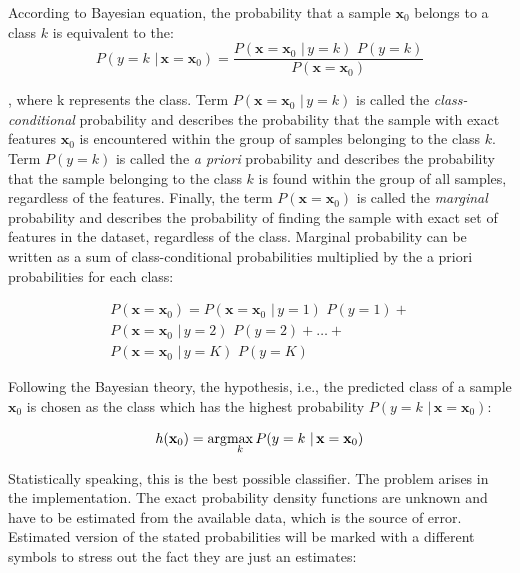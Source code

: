 According to Bayesian equation, the probability that a sample $\mathbf{x}_0$ belongs to a class $k$ is equivalent to the: 
\begin{equation} 
P(y=k \,\, | \, \mathbf{x}=\mathbf{x}_0) = \frac{P(\mathbf{x}=\mathbf{x}_0  \,\, | \, y=k) \,\,P(y=k)} {P(\mathbf{x}=\mathbf{x}_0)}
\end{equation}

\noindent
, where k represents the class. Term $P(\mathbf{x}=\mathbf{x}_0  \,\, | \, y=k)$ is called the \emph{class-conditional} probability and describes the probability that the sample with exact features $\mathbf{x}_0$ is encountered within the group of samples belonging to the class $k$. Term $P(y=k)$ is called the \emph{a priori} probability and describes the probability that the sample belonging to the class $k$ is found within the group of all samples, regardless of the features. Finally, the term $P(\mathbf{x}=\mathbf{x}_0)$ is called the \emph{marginal} probability and describes the probability of finding the sample with exact set of features in the dataset, regardless of the class. Marginal probability can be written as a sum of class-conditional probabilities multiplied by the a priori probabilities for each class:

\begin{equation}
\begin{split}
P(\mathbf{x}=\mathbf{x}_0) = P(\mathbf{x}=\mathbf{x}_0  \,\, | \, y=1) \,\,P(y=1) + \\
P(\mathbf{x}=\mathbf{x}_0  \,\, | \, y=2) \,\,P(y=2) + \dots + \\
P(\mathbf{x}=\mathbf{x}_0  \,\, | \, y=K) \,\,P(y=K)
\end{split}
\end{equation}


Following the Bayesian theory, the hypothesis, i.e., the predicted class of a sample $\mathbf{x}_0$ is chosen as the class which has the highest probability $P(y=k \,\, | \, \mathbf{x}=\mathbf{x}_0)$:

\begin{equation} 
h(\mathbf{x}_0) = \arg\!\max_k P(y=k \,\, | \, \mathbf{x}=\mathbf{x}_0)
\end{equation}

Statistically speaking, this is the best possible classifier. The problem arises in the implementation. The exact probability density functions are unknown and have to be estimated from the available data, which is the source of error.
Estimated version of the stated probabilities will be marked with a different symbols to stress out the fact they are just an estimates:

